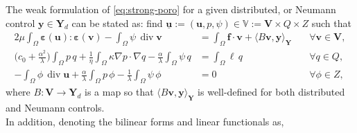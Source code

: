 \documentclass[smallextended]{svjour3}
\numberwithin{equation}{section}
\numberwithin{figure}{section}
\numberwithin{table}{section}
\newcommand\bV{\mathbf{V}}
\newcommand\ff{\boldsymbol{f}}
\newcommand\bg{\boldsymbol{g}}
\newcommand\beps{\boldsymbol{\varepsilon}}
\newcommand\buu{\underline{\boldsymbol{u}}}
\newcommand\by{\boldsymbol{y}}
\newcommand\bu{\boldsymbol{u}}
\newcommand\bv{\boldsymbol{v}}
\newcommand{\bYd}{\boldsymbol{Y}_d}
\newcommand{\bY}{\boldsymbol{Y}}
\newcommand{\bbV}{\mathbb{V}}
\newcommand{\bbR}{\mathbb{R}}
\newcommand\vdiv{{\mathop{\mathrm{div}}\nolimits}}
\begin{document}
	The weak formulation of  \eqref{eq:strong-poro} for a given distributed, or Neumann control $\by \in \bYd$ 
	 can be stated as: find $\buu:=(\bu, p, \psi) \in \bbV:= \bV \times Q \times Z$
	 such that
	\begin{subequations} \label{eq:weak-control}
		\begin{align}
			2 \mu \int_{\Omega} \beps(\bu):\beps(\bv) - \int_{\Omega}\psi \, \vdiv \bv & = \int_{\Omega} \ff \cdot \bv 
            + \langle B \bv, \by \rangle_{\bY} 
			 & \quad \forall \bv \in \bV, \\
			\biggl(c_0 +\frac{\alpha^2}{{\lambda}}\biggr) \int_{\Omega} p \,q + \frac{1}{\eta} \int_{\Omega} \kappa \nabla p \cdot \nabla q - \frac{\alpha}{{\lambda}} \int_{\Omega} \psi\, q &= \int_{\Omega}  \ell \, q & \quad \forall q \in Q, \\
			- \int_{\Omega} \phi\, \vdiv \bu  + \frac{\alpha}{\lambda} \int_{\Omega} p \,\phi - \frac{1}{\lambda} \int_{\Omega} \psi \, \phi & = 0 & \quad \forall \phi \in Z,
		\end{align}
	\end{subequations}
	where $B: \bV \to \bY_d$ is a map so that $\langle B \bv, \by \rangle_{\bY}$ is well-defined for both distributed and Neumann controls.\\
		In addition, denoting the bilinear forms and linear functionals as,
\end{document}
